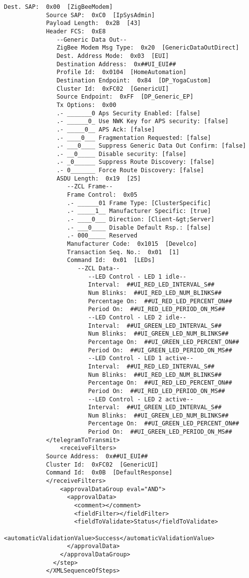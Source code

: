\documentclass[Main]{subfiles}
\begin{document}
\begin{lstlisting}[caption=Set LED Green, style=Code-XML]
			Dest. SAP:  0x00  [ZigBeeModem]
			Source SAP:  0xC0  [IpSysAdmin]
			Payload Length:  0x2B  [43]
			Header FCS:  0xE8
			   --Generic Data Out--
			   ZigBee Modem Msg Type:  0x20  [GenericDataOutDirect]
			   Dest. Address Mode:  0x03  [EUI]
			   Destination Address:  0x##UI_EUI##
			   Profile Id:  0x0104  [HomeAutomation]
			   Destination Endpoint:  0x84  [DP_YogaCustom]
			   Cluster Id:  0xFC02  [GenericUI]
			   Source Endpoint:  0xFF  [DP_Generic_EP]
			   Tx Options:  0x00  
			   .- _______0 Aps Security Enabled: [false]
			   .- ______0_ Use NWK Key for APS security: [false]
			   .- _____0__ APS Ack: [false]
			   .- ____0___ Fragmentation Requested: [false]
			   .- ___0____ Suppress Generic Data Out Confirm: [false]
			   .- __0_____ Disable security: [false]
			   .- _0______ Suppress Route Discovery: [false]
			   .- 0_______ Force Route Discovery: [false]
			   ASDU Length:  0x19  [25]
			      --ZCL Frame--
			      Frame Control:  0x05  
			      .- ______01 Frame Type: [ClusterSpecific]
			      .- _____1__ Manufacturer Specific: [true]
			      .- ____0___ Direction: [Client-&gt;Server]
			      .- ___0____ Disable Default Rsp.: [false]
			      .- 000_____ Reserved
			      Manufacturer Code:  0x1015  [Develco]
			      Transaction Seq. No.:  0x01  [1]
			      Command Id:  0x01  [LEDs]
			         --ZCL Data--
			            --LED Control - LED 1 idle--
			            Interval:  ##UI_RED_LED_INTERVAL_S##
			            Num Blinks:  ##UI_RED_LED_NUM_BLINKS##
			            Percentage On:  ##UI_RED_LED_PERCENT_ON##
			            Period On:  ##UI_RED_LED_PERIOD_ON_MS##
			            --LED Control - LED 2 idle--
			            Interval:  ##UI_GREEN_LED_INTERVAL_S##
			            Num Blinks:  ##UI_GREEN_LED_NUM_BLINKS##
			            Percentage On:  ##UI_GREEN_LED_PERCENT_ON##
			            Period On:  ##UI_GREEN_LED_PERIOD_ON_MS##
			            --LED Control - LED 1 active--
			            Interval:  ##UI_RED_LED_INTERVAL_S##
			            Num Blinks:  ##UI_RED_LED_NUM_BLINKS##
			            Percentage On:  ##UI_RED_LED_PERCENT_ON##
			            Period On:  ##UI_RED_LED_PERIOD_ON_MS##
			            --LED Control - LED 2 active--
			            Interval:  ##UI_GREEN_LED_INTERVAL_S##
			            Num Blinks:  ##UI_GREEN_LED_NUM_BLINKS##
			            Percentage On:  ##UI_GREEN_LED_PERCENT_ON##
			            Period On:  ##UI_GREEN_LED_PERIOD_ON_MS##
			</telegramToTransmit>
			    <receiveFilters>
			Source Address:  0x##UI_EUI##
			Cluster Id:  0xFC02  [GenericUI]
			Command Id:  0x0B  [DefaultResponse]
			</receiveFilters>
			    <approvalDataGroup eval="AND">
			      <approvalData>
			        <comment></comment>
			        <fieldFilter></fieldFilter>
			        <fieldToValidate>Status</fieldToValidate>
			        <automaticValidationValue>Success</automaticValidationValue>
			      </approvalData>
			    </approvalDataGroup>
			  </step>
			</XMLSequenceOfSteps>
		\end{lstlisting}
		

\end{document}
